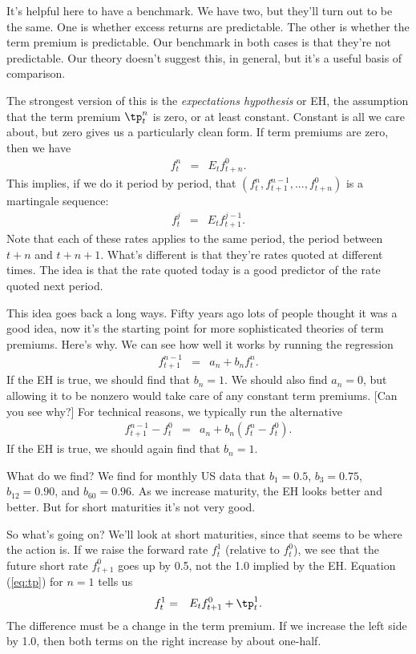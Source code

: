 \documentclass[11pt]{article}
\begin{document}
It's helpful here to have a benchmark.
We have two, but they'll turn out to be the same.
One is whether excess returns are predictable.
The other is whether the term premium is predictable.
Our benchmark in both cases is that they're not predictable.
Our theory doesn't suggest this, in general,
but it's a useful basis of comparison.

The strongest version of this is the {\it expectations hypothesis\/} or EH,
the assumption that the term premium $\tp^n_t$ is zero, or at least constant.
Constant is all we care about, but zero gives us a particularly clean form.
If term premiums are zero, then we have
\begin{eqnarray*}
    f^n_t &=& E_t f^0_{t+n} .
\end{eqnarray*}
This implies, if we do it period by period, that
$(f^n_t, f^{n-1}_{t+1}, ... , f^0_{t+n})$
is a martingale sequence:
\begin{eqnarray*}
    f^j_t &=& E_t f^{j-1}_{t+1} .
\end{eqnarray*}
Note that each of these rates applies to the same period,
the period between $t+n$ and $t+n+1$.
What's different is that they're rates quoted at different times.
The idea is that the rate quoted today is a good predictor of the rate
quoted next period.

This idea goes back a long ways.
Fifty years ago lots of people thought it was a good idea,
now it's the starting point for more sophisticated theories
of term premiums.
Here's why.
We can see how well it works by running the regression
\begin{eqnarray*}
    f^{n-1}_{t+1} &=& a_n + b_n f^n_t .
\end{eqnarray*}
If the EH is true, we should find that $b_n = 1$.
We should also find $a_n=0$, but allowing it to be nonzero
would take care of any constant term premiums.
[Can you see why?]
For technical reasons, we typically run the alternative
\begin{eqnarray*}
    f^{n-1}_{t+1} - f^0_t &=& a_n + b_n (f^n_t - f^0_t) .
\end{eqnarray*}
If the EH is true, we should again find that $b_n = 1$.

What do we find?
We find for monthly US data that $b_1 = 0.5$, $b_3 = 0.75$,
$b_{12} = 0.90$, and $b_{60} = 0.96$.
As we increase maturity, the EH looks better and better.
But for short maturities it's not very good.

So what's going on?
We'll look at short maturities, since that seems to be where the action is.
If we raise the forward rate $f^1_t$ (relative to $f^0_t$),
we see that the future short rate $f^0_{t+1}$ goes up by 0.5,
not the 1.0 implied by the EH.
Equation (\ref{eq:tp}) for $n=1$ tells us
\begin{eqnarray*}
    f^1_t &=&  E_t f^0_{t+1} + \tp^1_t .
\end{eqnarray*}
The difference must be a change in the term premium.
If we increase the left side by 1.0, then both terms on the right increase
by about one-half.
\end{document}
